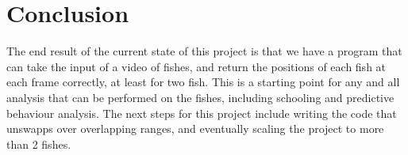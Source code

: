\documentclass[12pt]{article}
\begin{document}

\section{Conclusion}

The end result of the current state of this project is that we have a program that can take the input of a video of fishes, and return the positions of each fish at each frame correctly, at least for two fish. This is a starting point for any and all analysis that can be performed on the fishes, including schooling and predictive behaviour analysis. The next steps for this project include writing the code that unswapps over overlapping ranges, and eventually scaling the project to more than 2 fishes.
\end{document}
